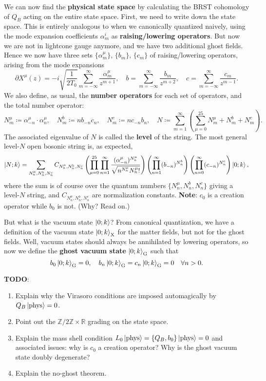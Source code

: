 \documentclass{report}
\theoremstyle{plain}
\theoremstyle{definition}
\theoremstyle{remark}
\newcommand{\di}{\partial}
\newcommand{\bR}{\mathbb{R}}
\newcommand{\bZ}{\mathbb{Z}}
\begin{document}
We can now find the {\bf physical state space} by calculating the BRST
cohomology of $Q_B$ acting on the entire state space. First, we need
to write down the state space. This is entirely analogous to when we
canonically quantized naively, using the mode expansion coefficients
$\alpha_m^i$ as {\bf raising/lowering operators}. But now we are not
in lightcone gauge anymore, and we have two additional ghost fields.
Hence we now have three sets $\{\alpha_m^\mu\}$, $\{b_m\}$, $\{c_m\}$
of raising/lowering operators, arising from the mode expansions
\[ \di X^\mu(z) = -i\sqrt{\frac{1}{2T_0}} \sum_{m=-\infty}^\infty \frac{\alpha_m^\mu}{z^{m+1}}, \quad b = \sum_{m=-\infty}^\infty \frac{b_m}{z^{m+2}}, \quad c = \sum_{m=-\infty}^\infty \frac{c_m}{z^{m-1}}. \]
We also define, as usual, the {\bf number operators} for each set of
operators, and the total number operator:
\[ N_m^\mu \coloneqq \alpha^\mu_{-n} \cdot \alpha^\mu_n, \quad N_m^b \coloneqq nb_{-n} c_n, \quad N_m^c \coloneqq nc_{-n} b_n, \quad N \coloneqq \sum_{m=1}^\infty \left(\sum_{\mu=0}^{25} N_m^\mu + N_m^b + N_m^c\right). \]
The associated eigenvalue of $N$ is called the {\bf level} of the
string. The most general level-$N$ open bosonic string is, as
expected,
\[ \ket{N; k} = \sum_{N_n^{\mu}, N_n^b, N_n^c} C_{N_n^{\mu}, N_n^b, N_n^c} \left(\prod_{\mu=0}^{25} \prod_{n=1}^\infty \frac{(\alpha^\mu_{-n})^{N_n^\mu}}{\sqrt{n^{N_n^\mu} N_n^\mu!}}\right) \left(\prod_{n=1}^\infty (b_{-n})^{N_n^b}\right) \left(\prod_{n=0}^\infty (c_{-n})^{N_n^c}\right) \ket{0; k}, \]
where the sum is of course over the quantum numbers $\{N_n^{\mu},
N_n^b, N_n^c\}$ giving a level-$N$ string, and $C_{N_n^{\mu}, N_n^b,
  N_n^c}$ are normalization constants. {\bf Note}: $c_0$ is a creation
operator while $b_0$ is not. (Why? Read on.)

But what is the vacuum state $\ket{0; k}$? From canonical
quantization, we have a definition of the vacuum state $\ket{0;
  k}_{\text{X}}$ for the matter fields, but not for the ghost fields.
Well, vacuum states should always be annihilated by lowering
operators, so now we define the {\bf ghost vacuum state} $\ket{0;
  k}_{\text{G}}$ such that
\[ b_0\ket{0; k}_{\text{G}} = 0, \quad b_n\ket{0; k}_{\text{G}} = c_n\ket{0; k}_{\text{G}} = 0 \quad \forall n > 0. \]

{\color{blue} \bf TODO}:
\begin{enumerate}
\item Explain why the Virasoro conditions are imposed automagically by
  $Q_B\ket{\text{phys}} = 0$.
\item Point out the $\bZ/2\bZ \times \bR$ grading on the state space.
\item Explain the mass shell condition $L_0\ket{\text{phys}} = \{Q_B,
  b_0\}\ket{\text{phys}} = 0$ and associated issues: why is $c_0$ a
  creation operator? Why is the ghost vacuum state doubly degenerate?
\item Explain the no-ghost theorem.
\end{enumerate}
\end{document}
